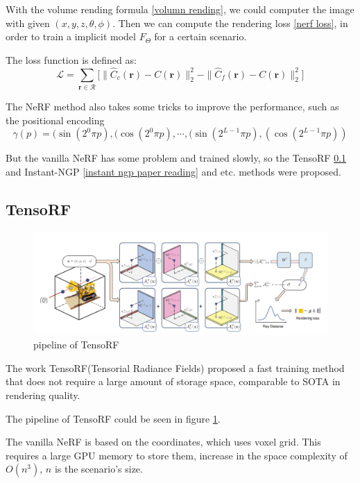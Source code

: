 With the volume rending formula \ref{volumn rending}, we could computer the image with given $(x,y,z,\theta,\phi)$. Then we can compute the rendering loss \ref{nerf loss}, in order to train a implicit model $F_{\Theta}$ for a certain scenario.

The loss function is defined as:
\begin{equation}
\mathcal{L}=\sum_{\mathbf{r}\in\mathcal{R}}\big[\|\hat{C}_c(\mathbf{r})-C(\mathbf{r})\|_2^2-\|\hat{C}_f(\mathbf{r})-C(\mathbf{r})\|_2^2\big]
\label{nerf loss}
\end{equation}

The NeRF method also takes some tricks to improve the performance, such as the positional encoding 
$$\gamma(p)=(\sin(2^0\pi p),(\cos(2^0\pi p),\cdots,(\sin(2^{L-1}\pi p),(\cos(2^{L-1}\pi p))$$

But the vanilla NeRF has some problem and trained slowly, so the TensoRF \ref{TensoRF paper reading} and Instant-NGP \ref{instant ngp paper reading} and etc. methods were proposed.

\subsection{TensoRF}
\label{TensoRF paper reading}

\begin{figure}[htbp]
\centering
\includegraphics[width=0.9\linewidth]{img/TensoRF.png}
\caption{pipeline of TensoRF}
\label{TensoRF pipeline}
\end{figure}

The work TensoRF(Tensorial Radiance Fields) \cite{TensoRF} proposed a fast training method that does not require a large amount of storage space, comparable to SOTA in rendering quality.

The pipeline of TensoRF could be seen in figure \ref{TensoRF pipeline}.

The vanilla NeRF is based on the coordinates, which uses voxel grid. This requires a large GPU memory to store them, increase in the space complexity of $O(n^3)$, $n$ is the scenario's size.


